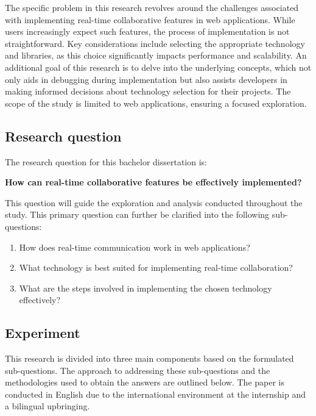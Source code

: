 The specific problem in this research revolves around the challenges associated with implementing real-time collaborative features in web applications. While users increasingly expect such features, the process of implementation is not straightforward. Key considerations include selecting the appropriate technology and libraries, as this choice significantly impacts performance and scalability. An additional goal of this research is to delve into the underlying concepts, which not only aids in debugging during implementation but also assists developers in making informed decisions about technology selection for their projects. The scope of the study is limited to web applications, ensuring a focused exploration.

\subsection{Research question}

The research question for this bachelor dissertation is:

\textbf{How can real-time collaborative features be effectively implemented?}

This question will guide the exploration and analysis conducted throughout the study. This primary question can further be clarified into the following sub-questions:

\begin{enumerate}
    \item How does real-time communication work in web applications?
    \item What technology is best suited for implementing real-time collaboration?
    \item What are the steps involved in implementing the chosen technology effectively?
\end{enumerate}

\subsection{Experiment}

This research is divided into three main components based on the formulated sub-questions. The approach to addressing these sub-questions and the methodologies used to obtain the answers are outlined below. The paper is conducted in English due to the international environment at the internship and a bilingual upbringing.

